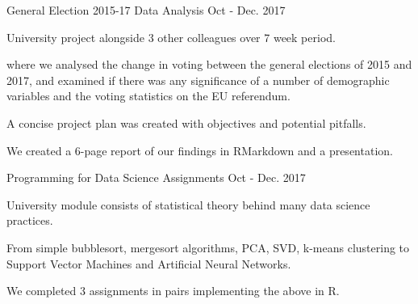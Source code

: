 

\begin{cventries}

  \cventry
    {} %
    {General Election 2015-17 Data Analysis} %
    {} %
    {Oct - Dec. 2017} %
    {
      \begin{cvitems} %
        \item {University project alongside 3 other colleagues over 7 week period.}
        \item{where we analysed the change in voting between the general elections of 2015 and 2017, and examined if there was any significance of a number of demographic variables and the voting statistics on the EU referendum.}
        \item{A concise project plan was created with objectives and potential pitfalls.}
        \item {We created a 6-page report of our findings in RMarkdown and a presentation.}
      \end{cvitems}
    }

  \cventry
    {} %
    {Programming for Data Science Assignments} %
    {} %
    {Oct - Dec. 2017} %
    {
      \begin{cvitems} %
        \item {University module consists of statistical theory behind many data science practices.}
        \item {From simple bubblesort, mergesort algorithms, PCA, SVD, k-means clustering to Support Vector Machines and Artificial Neural Networks. }
        \item{We completed 3 assignments in pairs implementing the above in R. }
      \end{cvitems}
    }


\end{cventries}
